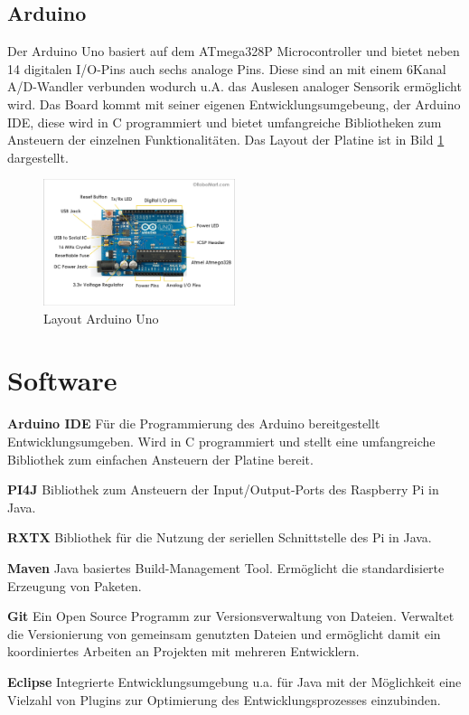 \subsection{Arduino}

Der Arduino Uno basiert auf dem ATmega328P Microcontroller und bietet neben 14 digitalen I/O-Pins auch sechs analoge Pins. Diese sind an mit einem 6Kanal A/D-Wandler verbunden wodurch u.A. das Auslesen analoger Sensorik ermöglicht wird. Das Board kommt mit seiner eigenen Entwicklungsumgebeung, der Arduino IDE, diese wird in C programmiert und bietet umfangreiche Bibliotheken zum Ansteuern der einzelnen Funktionalitäten. Das Layout der Platine ist in Bild \ref{img:arduino_layout} dargestellt.


\begin{figure}
	\centering
	\includegraphics[width=0.5\textwidth]{figures/arduino_layout.png}
	\caption{Layout Arduino Uno}
	\label{img:arduino_layout}
\end{figure}


\section{Software}

\begin{list}{}{}
 \item \textbf{Arduino IDE} Für die Programmierung des Arduino bereitgestellt Entwicklungsumgeben. Wird in C programmiert und stellt eine umfangreiche Bibliothek zum einfachen Ansteuern der Platine bereit.
 \item \textbf{PI4J} Bibliothek zum Ansteuern der Input/Output-Ports des Raspberry Pi in Java.
 \item \textbf{RXTX} Bibliothek für die Nutzung der seriellen Schnittstelle des Pi in Java.
 \item \textbf{Maven} Java basiertes Build-Management Tool. Ermöglicht die standardisierte Erzeugung von Paketen.
 \item \textbf{Git} Ein Open Source Programm zur Versionsverwaltung von Dateien. Verwaltet die Versionierung von gemeinsam genutzten Dateien und ermöglicht damit ein koordiniertes Arbeiten an Projekten mit mehreren Entwicklern.
 \item \textbf{Eclipse} Integrierte Entwicklungsumgebung u.a. für Java mit der Möglichkeit eine Vielzahl von Plugins zur Optimierung des Entwicklungsprozesses einzubinden.
\end{list}

